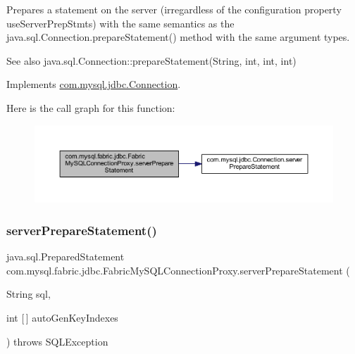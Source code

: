 Prepares a statement on the server (irregardless of the configuration property \textquotesingle{}use\+Server\+Prep\+Stmts\textquotesingle{}) with the same semantics as the java.\+sql.\+Connection.\+prepare\+Statement() method with the same argument types.

\begin{DoxySeeAlso}{See also}
java.\+sql.\+Connection\+::prepare\+Statement(\+String, int, int, int) 
\end{DoxySeeAlso}


Implements \mbox{\hyperlink{interfacecom_1_1mysql_1_1jdbc_1_1_connection_aa815a139c20cb2ecb32bc50fca219c6e}{com.\+mysql.\+jdbc.\+Connection}}.

Here is the call graph for this function\+:\nopagebreak
\begin{figure}[H]
\begin{center}
\leavevmode
\includegraphics[width=350pt]{classcom_1_1mysql_1_1fabric_1_1jdbc_1_1_fabric_my_s_q_l_connection_proxy_a2465abeeee2f1a83f9a2632f3c577a6b_cgraph}
\end{center}
\end{figure}
\mbox{\label{classcom_1_1mysql_1_1fabric_1_1jdbc_1_1_fabric_my_s_q_l_connection_proxy_a023b1e89c0984415dfad1c569194eff9}} 
\subsubsection{\texorpdfstring{server\+Prepare\+Statement()}{serverPrepareStatement()}\hspace{0.1cm}{\footnotesize\ttfamily [5/6]}}
{\footnotesize\ttfamily java.\+sql.\+Prepared\+Statement com.\+mysql.\+fabric.\+jdbc.\+Fabric\+My\+S\+Q\+L\+Connection\+Proxy.\+server\+Prepare\+Statement (\begin{DoxyParamCaption}\item[{String}]{sql,  }\item[{int \mbox{[}$\,$\mbox{]}}]{auto\+Gen\+Key\+Indexes }\end{DoxyParamCaption}) throws S\+Q\+L\+Exception}

